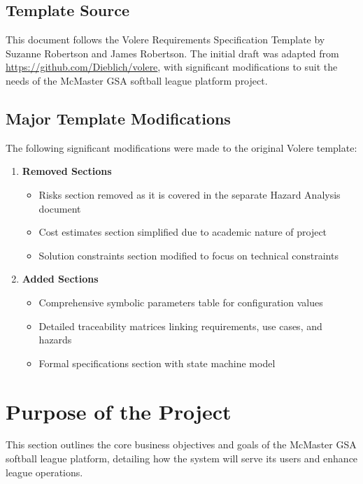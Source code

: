 \documentclass[12pt, titlepage]{article}
\begin{document}
\subsection{Template Source}
This document follows the Volere Requirements Specification Template by Suzanne Robertson and James Robertson. The initial draft was adapted from \url{https://github.com/Dieblich/volere}, with significant modifications to suit the needs of the McMaster GSA softball league platform project.

\subsection{Major Template Modifications}
The following significant modifications were made to the original Volere template:

\begin{enumerate}
    \item \textbf{Removed Sections}
    \begin{itemize}
        \item Risks section removed as it is covered in the separate Hazard Analysis document
        \item Cost estimates section simplified due to academic nature of project
        \item Solution constraints section modified to focus on technical constraints
    \end{itemize}

    \item \textbf{Added Sections}
    \begin{itemize}
        \item Comprehensive symbolic parameters table for configuration values
        \item Detailed traceability matrices linking requirements, use cases, and hazards
        \item Formal specifications section with state machine model
    \end{itemize}
\end{enumerate}

\section{Purpose of the Project}
This section outlines the core business objectives and goals of the McMaster GSA softball league platform, detailing how the system will serve its users and enhance league operations.
\end{document}
